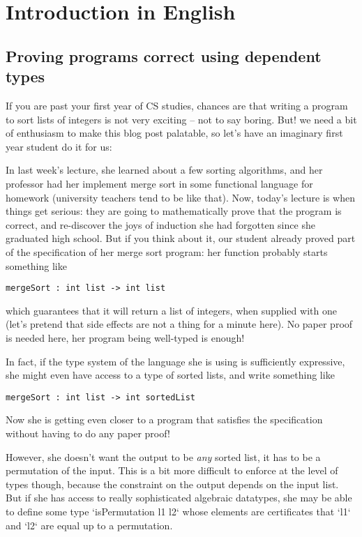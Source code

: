 \setchapterpreamble[u]{\margintoc}
\chapter{Introduction in English}

\section{Proving programs correct using dependent types}

If you are past your first year of CS studies, chances are that writing a program
to sort lists of integers is not very exciting -- not to say boring.
But! we need a bit of enthusiasm to make this blog post palatable, so let's have
an imaginary first year student do it for us:

In last week's lecture, she learned about a few sorting algorithms, and her professor
had her implement merge sort in some functional language for homework (university teachers
tend to be like that).
Now, today's lecture is when things get serious: they are going to mathematically prove
that the program is correct, and re-discover the joys of induction she had forgotten
since she graduated high school.
But if you think about it, our student already proved part of the specification
of her merge sort program: her function probably starts something like

\begin{lstlisting}[style=kaolstplain,linewidth=1.5\textwidth]
    mergeSort : int list -> int list
\end{lstlisting}

which guarantees that it will return a list of integers, when supplied with one
(let's pretend that side effects are not a thing for a minute here). No paper proof
is needed here, her program being well-typed is enough!

In fact, if the type system of the language she is using is sufficiently expressive,
she might even have access to a type of sorted lists, and write something like

\begin{lstlisting}[style=kaolstplain,linewidth=1.5\textwidth]
    mergeSort : int list -> int sortedList
\end{lstlisting}

Now she is getting even closer to a program that satisfies the specification without
having to do any paper proof!

However, she doesn't want the output to be \emph{any} sorted list, it has to be a
permutation of the input. This is a bit more difficult to enforce at the
level of types though, because the constraint on the output depends on the input
list.
But if she has access to really sophisticated algebraic datatypes, she may be
able to define some type `isPermutation l1 l2` whose elements are certificates
that `l1` and `l2` are equal up to a permutation.

